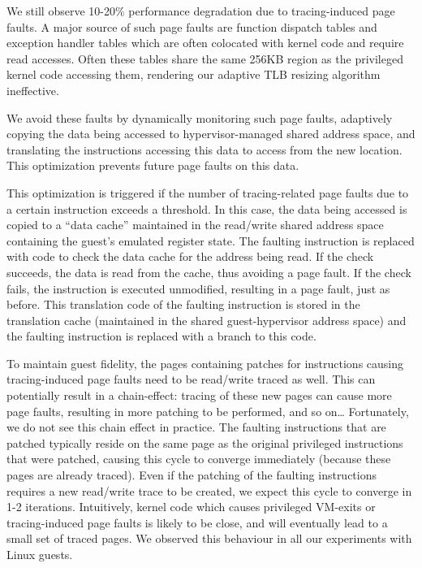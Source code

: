 \documentclass[10pt,twocolumn]{article}
\begin{document}
We still observe 10-20\% performance degradation due
to tracing-induced page faults. A major source of such page faults
are function dispatch tables and exception handler tables which are often
colocated with kernel code and require read accesses. Often these tables share
the same 256KB region as the privileged kernel code accessing them, rendering our
adaptive TLB resizing algorithm ineffective.

We avoid these faults by dynamically monitoring such page faults, adaptively
copying the data being accessed to hypervisor-managed shared address space, and
translating the instructions accessing this data to access from the new location.
This optimization prevents future page faults on this data.

This optimization is triggered if the number of tracing-related page faults
due to a certain instruction exceeds a threshold. In this case, the data being
accessed is copied
to a ``data cache'' maintained in the read/write shared address space containing
the guest's emulated register state. The faulting instruction is replaced with
code to check the data cache for the address being read. If the check succeeds, the
data is read from the cache, thus avoiding a page fault. If the check fails, the
instruction is executed unmodified, resulting in a page fault, just as before.
This translation code of the faulting instruction is stored in the translation
cache (maintained in the shared guest-hypervisor address space) and the faulting
instruction is replaced with a branch to this code.

To maintain guest fidelity, the pages containing patches for
instructions causing tracing-induced page faults need to be read/write traced as
well. This can potentially result in a chain-effect: tracing of these new pages
can cause more page faults, resulting in more patching to be performed, and so on\ldots
Fortunately, we do not see this chain effect in practice. The faulting instructions
that are patched typically reside on the same
page as the original privileged instructions that were patched, causing this
cycle to converge immediately (because these pages are already traced). Even if
the patching of the faulting instructions requires a new read/write trace to be
created, we expect this
cycle to converge in 1-2 iterations. Intuitively, kernel code which causes privileged
VM-exits or tracing-induced page faults is likely to be close, and will eventually
lead to a small set of traced pages. We observed this behaviour in all our experiments
with Linux guests.
\end{document}
